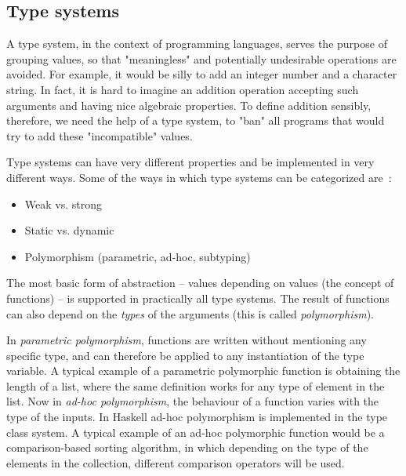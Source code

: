         \subsection{Type systems}
        \label{subsec:type-systems}
            A type system, in the context of programming languages,
            serves the purpose of grouping values, so that "meaningless" and potentially undesirable operations are avoided.
            For example, it would be silly to add an integer number and a character string.
            In fact, it is hard to imagine an addition operation accepting such arguments and having nice algebraic properties.
            To define addition sensibly, therefore, we need the help of a type system,
            to "ban" all programs that would try to add these "incompatible" values.

            Type systems can have very different properties and be implemented in very different ways.
            Some of the ways in which type systems can be categorized are~\cite{understanding-types-cardelli}:

            \begin{itemize}
                \item Weak vs. strong
                \item Static vs. dynamic
                \item Polymorphism (parametric, ad-hoc, subtyping)
            \end{itemize}

            The most basic form of abstraction -- values depending on values (the concept of functions) -- is
            supported in practically all type systems.
            The result of functions can also depend on the \emph{types} of the arguments
            (this is called \emph{polymorphism}).

            In \emph{parametric polymorphism}, functions are written without mentioning any specific type,
            and can therefore be applied to any instantiation of the type variable.
            A typical example of a parametric polymorphic function is obtaining the length of a list,
            where the same definition works for any type of element in the list.
            Now in \emph{ad-hoc polymorphism}, the behaviour of a function varies with the type of the inputs.
            In Haskell ad-hoc polymorphism is implemented in the type class system.
            A typical example of an ad-hoc polymorphic function would be a comparison-based sorting algorithm,
            in which depending on the type of the elements in the collection,
            different comparison operators will be used.

